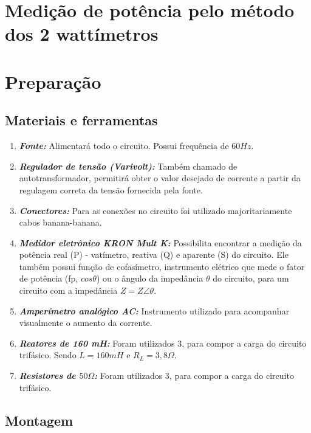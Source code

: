 \documentclass[a4paper,12pt,oneside,openany,table,xcdraw]{article}
\begin{document}
\section{Medição de potência pelo método dos 2 wattímetros}


\section{Preparação}
\subsection{Materiais e ferramentas} %
\begin{enumerate}[1 -]
\item \emph{\textbf{Fonte:}}
Alimentará todo o circuito. Possui frequência de $60Hz$.

\item \emph{\textbf{Regulador de tensão (Varivolt):}}
Também chamado de autotransformador, permitirá obter o valor desejado de corrente a partir da regulagem correta da tensão fornecida pela fonte.

\item \emph{\textbf{Conectores:}}
Para as conexões no circuito foi utilizado majoritariamente cabos banana-banana.

\item \emph{\textbf{Medidor eletrônico KRON Mult K:}}
Possibilita encontrar a medição da potência real (P) - vatímetro, reativa (Q) e aparente (S) do circuito. Ele também possui função de cofasímetro, instrumento elétrico que mede o fator de potência (fp, $cos\theta$) ou o ângulo da impedância $\theta$ do circuito, para um circuito com a impedância $Z = Z\angle \theta$.

\item \emph{\textbf{Amperímetro analógico AC:}}
Instrumento utilizado para acompanhar visualmente o aumento da corrente.

\item \emph{\textbf{Reatores de 160 mH:}}
Foram utilizados 3, para compor a carga do circuito trifásico. Sendo $L=160mH$ e $R_L=3,8\Omega$.

\item \emph{\textbf{Resistores de $50\Omega$:}}
Foram utilizados 3, para compor a carga do circuito trifásico.
\end{enumerate}

\subsection{Montagem} %
\end{document}
